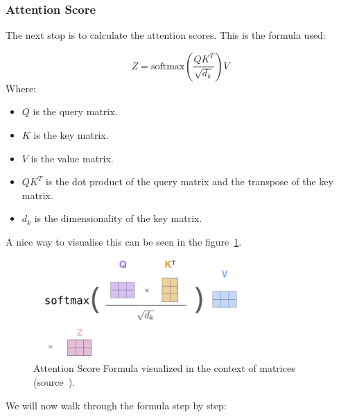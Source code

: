 \subsubsection{Attention Score}
The next stop is to calculate the attention scores. This is the formula used:

\[
	Z =
	\text{softmax}\left(\frac{QK^T}{\sqrt{d_k}}\right)V
\]
\bigbreak
Where:
\begin{itemize}
	\item $Q$ is the query matrix.
	\item $K$ is the key matrix.
	\item $V$ is the value matrix.
	\item $QK^{T}$ is the dot product of the query matrix and the transpose of the key matrix.
	\item $d_{k}$ is the dimensionality of the key matrix.
\end{itemize}
A nice way to visualise this can be seen in the figure~\cref{fig:attention_score_matrix_form}.
\begin{figure}[H]
	\centering
	\includegraphics[width=0.7\textwidth]{figures/attention_formula_matrix_form.png}
	\caption{Attention Score Formula visualized in the context of matrices (source~\autocite{alammarIllustratedTransformer}).}
	\label{fig:attention_score_matrix_form}
\end{figure}
We will now walk through the formula step by step:

